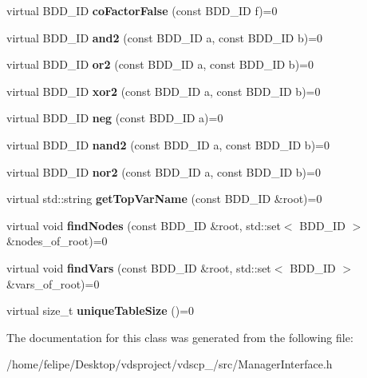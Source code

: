 \begin{DoxyCompactItemize}
\item 
virtual B\+D\+D\+\_\+\+ID {\bfseries co\+Factor\+False} (const B\+D\+D\+\_\+\+ID f)=0\label{classClassProject_1_1ManagerInterface_a308c99661ad02f407d6f2b0af6230e80}

\item 
virtual B\+D\+D\+\_\+\+ID {\bfseries and2} (const B\+D\+D\+\_\+\+ID a, const B\+D\+D\+\_\+\+ID b)=0\label{classClassProject_1_1ManagerInterface_af914326d34a1ed42710f7b11e5baf010}

\item 
virtual B\+D\+D\+\_\+\+ID {\bfseries or2} (const B\+D\+D\+\_\+\+ID a, const B\+D\+D\+\_\+\+ID b)=0\label{classClassProject_1_1ManagerInterface_a8dbfde761b1e94d1f222b4d27f3c6fbc}

\item 
virtual B\+D\+D\+\_\+\+ID {\bfseries xor2} (const B\+D\+D\+\_\+\+ID a, const B\+D\+D\+\_\+\+ID b)=0\label{classClassProject_1_1ManagerInterface_a2b2c4948ef41ddb1036289cd07dac156}

\item 
virtual B\+D\+D\+\_\+\+ID {\bfseries neg} (const B\+D\+D\+\_\+\+ID a)=0\label{classClassProject_1_1ManagerInterface_a57d34af3121dcf5366d22ecf792f05a0}

\item 
virtual B\+D\+D\+\_\+\+ID {\bfseries nand2} (const B\+D\+D\+\_\+\+ID a, const B\+D\+D\+\_\+\+ID b)=0\label{classClassProject_1_1ManagerInterface_aaf6e357d680613e449d3ea958c9abba1}

\item 
virtual B\+D\+D\+\_\+\+ID {\bfseries nor2} (const B\+D\+D\+\_\+\+ID a, const B\+D\+D\+\_\+\+ID b)=0\label{classClassProject_1_1ManagerInterface_a312d9865eae2d6355e17855cba78bc78}

\item 
virtual std\+::string {\bfseries get\+Top\+Var\+Name} (const B\+D\+D\+\_\+\+ID \&root)=0\label{classClassProject_1_1ManagerInterface_afde45b2065361dfa6e61c1c7bc3fc1b4}

\item 
virtual void {\bfseries find\+Nodes} (const B\+D\+D\+\_\+\+ID \&root, std\+::set$<$ B\+D\+D\+\_\+\+ID $>$ \&nodes\+\_\+of\+\_\+root)=0\label{classClassProject_1_1ManagerInterface_ab460e331ffdb85d4128574b3aae72c1e}

\item 
virtual void {\bfseries find\+Vars} (const B\+D\+D\+\_\+\+ID \&root, std\+::set$<$ B\+D\+D\+\_\+\+ID $>$ \&vars\+\_\+of\+\_\+root)=0\label{classClassProject_1_1ManagerInterface_ab94feabca2125d334e542e502ae0186d}

\item 
virtual size\+\_\+t {\bfseries unique\+Table\+Size} ()=0\label{classClassProject_1_1ManagerInterface_a85cac80444b26e5b80eb96b9f1231c0e}

\end{DoxyCompactItemize}


The documentation for this class was generated from the following file\+:\begin{DoxyCompactItemize}
\item 
/home/felipe/\+Desktop/vdsproject/vdscp\+\_/src/Manager\+Interface.\+h\end{DoxyCompactItemize}
